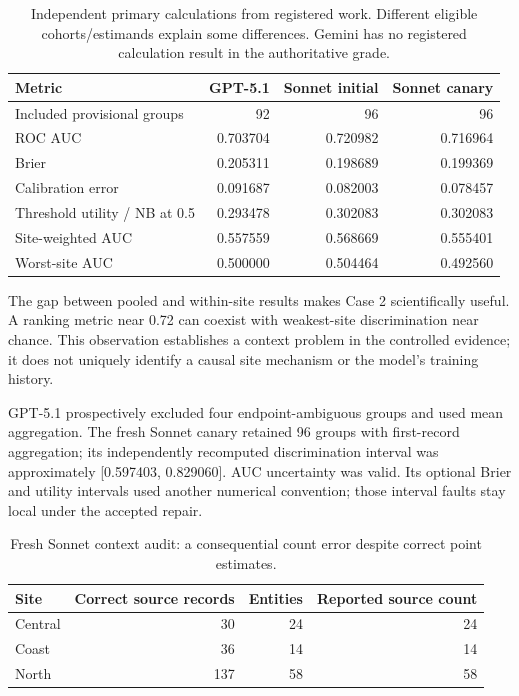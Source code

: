 \documentclass[11pt,a4paper]{article}
\begin{document}
\begin{table}[H]\small
\caption{Independent primary calculations from registered work. Different eligible cohorts/estimands explain some differences. Gemini has no registered calculation result in the authoritative grade.}
\begin{tabularx}{\textwidth}{@{}Yrrr@{}}\toprule
Metric & GPT-5.1 & Sonnet initial & Sonnet canary \\\midrule
Included provisional groups & 92 & 96 & 96 \\
ROC AUC & 0.703704 & 0.720982 & 0.716964 \\
Brier & 0.205311 & 0.198689 & 0.199369 \\
Calibration error & 0.091687 & 0.082003 & 0.078457 \\
Threshold utility / NB at 0.5 & 0.293478 & 0.302083 & 0.302083 \\
Site-weighted AUC & 0.557559 & 0.568669 & 0.555401 \\
Worst-site AUC & 0.500000 & 0.504464 & 0.492560 \\\bottomrule
\end{tabularx}
\end{table}

The gap between pooled and within-site results makes Case 2 scientifically useful. A ranking metric near 0.72 can coexist with weakest-site discrimination near chance. This observation establishes a context problem in the controlled evidence; it does not uniquely identify a causal site mechanism or the model's training history.

GPT-5.1 prospectively excluded four endpoint-ambiguous groups and used mean aggregation. The fresh Sonnet canary retained 96 groups with first-record aggregation; its independently recomputed discrimination interval was approximately [0.597403, 0.829060]. AUC uncertainty was valid. Its optional Brier and utility intervals used another numerical convention; those interval faults stay local under the accepted repair.

\begin{table}[H]\small
\caption{Fresh Sonnet context audit: a consequential count error despite correct point estimates.}
\begin{tabularx}{\textwidth}{@{}Yrrr@{}}\toprule
Site & Correct source records & Entities & Reported source count \\\midrule
Central & 30 & 24 & 24 \\
Coast & 36 & 14 & 14 \\
North & 137 & 58 & 58 \\\bottomrule
\end{tabularx}
\end{table}
\end{document}
